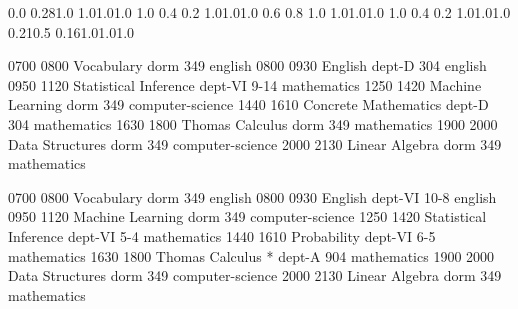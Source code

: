 \documentclass[a4paper,10pt]{report}
\begin{document}
\thispagestyle{empty}
\begin{landscape}

\setslotsize{2.8cm}{0.3cm}
\settextframe{0.8mm}

\seteventcornerradius{0pt}


        {0.0} {0.28}{1.0} {1.0}{1.0}{1.0}
            {1.0} {0.4} {0.2} {1.0}{1.0}{1.0}
   {0.6} {0.8} {1.0} {1.0}{1.0}{1.0}
           {1.0} {0.4} {0.2} {1.0}{1.0}{1.0}
           {0.21}{0.5} {0.16}{1.0}{1.0}{1.0}

\begin{timetable}
  
   {0700} {0800}   {Vocabulary}                 {}      {dorm 349}      {english}
   {0800} {0930}   {English}                    {}      {dept-D 304}    {english}
   {0950} {1120}   {Statistical Inference}      {}      {dept-VI 9-14}  {mathematics}
   {1250} {1420}   {Machine Learning}           {}      {dorm 349}      {computer-science}
   {1440} {1610}   {Concrete Mathematics}       {}      {dept-D 304}    {mathematics}
   {1630} {1800}   {Thomas Calculus}            {}      {dorm 349}      {mathematics}
   {1900} {2000}   {Data Structures}            {}      {dorm 349}      {computer-science}
   {2000} {2130}   {Linear Algebra}             {}      {dorm 349}      {mathematics}
  

   {0700} {0800}   {Vocabulary}                 {}      {dorm 349}      {english}
   {0800} {0930}   {English}                    {}      {dept-VI 10-8}  {english}
   {0950} {1120}   {Machine Learning}           {}      {dorm 349}      {computer-science}
   {1250} {1420}   {Statistical Inference}      {}      {dept-VI 5-4}   {mathematics}
   {1440} {1610}   {Probability}                {}      {dept-VI 6-5}   {mathematics}
   {1630} {1800}   {Thomas Calculus}            {*}     {dept-A 904}    {mathematics}
   {1900} {2000}   {Data Structures}            {}      {dorm 349}      {computer-science}
   {2000} {2130}   {Linear Algebra}             {}      {dorm 349}      {mathematics}
  


\end{timetable}
\end{landscape}
\end{document}
